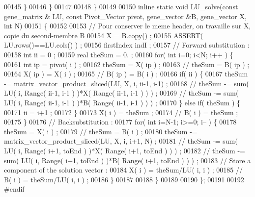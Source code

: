 \begin{DoxyCode}
00145       \}
00146     \}
00147 
00148   \}
00149 
00150   \textcolor{keyword}{inline} \textcolor{keyword}{static} \textcolor{keywordtype}{void} LU\_solve(\textcolor{keyword}{const} gene\_matrix & LU, \textcolor{keyword}{const} Pivot\_Vector pivot, gene\_vector &B, gene\_vector
       X, \textcolor{keywordtype}{int} N)
00151   \{
00152 
00153     \textcolor{comment}{// Pour conserver le meme header, on travaille sur X, copie du second-membre B}
00154     X = B.copy() ;
00155     ASSERT( LU.rows()==LU.cols() ) ;
00156     firstIndex indI ;
00157     \textcolor{comment}{// Forward substitution :}
00158     \textcolor{keywordtype}{int} ii = 0 ;
00159     real theSum = 0. ;
00160     \textcolor{keywordflow}{for}( \textcolor{keywordtype}{int} i=0; i<N; i++ ) \{
00161       \textcolor{keywordtype}{int} ip = pivot( i ) ;
00162       theSum = X( ip ) ;
00163       \textcolor{comment}{//      theSum = B( ip ) ;}
00164       X( ip ) = X( i ) ;
00165       \textcolor{comment}{//      B( ip ) = B( i ) ;}
00166       \textcolor{keywordflow}{if}( ii ) \{
00167     theSum -= matrix\_vector\_product\_sliced(LU, X, i, ii-1, i-1) ;
00168     \textcolor{comment}{//  theSum -= sum( LU( i, Range( ii-1, i-1 ) )*X( Range( ii-1, i-1 ) ) ) ;}
00169     \textcolor{comment}{//  theSum -= sum( LU( i, Range( ii-1, i-1 ) )*B( Range( ii-1, i-1 ) ) ) ;}
00170       \} \textcolor{keywordflow}{else} \textcolor{keywordflow}{if}( theSum ) \{
00171     ii = i+1 ;
00172       \}
00173       X( i ) = theSum ;
00174       \textcolor{comment}{//      B( i ) = theSum ;}
00175     \}
00176     \textcolor{comment}{// Backsubstitution :}
00177     \textcolor{keywordflow}{for}( \textcolor{keywordtype}{int} i=N-1; i>=0; i-- ) \{
00178       theSum = X( i ) ;
00179       \textcolor{comment}{//      theSum = B( i ) ;}
00180       theSum -= matrix\_vector\_product\_sliced(LU, X, i, i+1, N) ;
00181       \textcolor{comment}{//      theSum -= sum( LU( i, Range( i+1, toEnd ) )*X( Range( i+1, toEnd ) ) ) ;}
00182       \textcolor{comment}{//      theSum -= sum( LU( i, Range( i+1, toEnd ) )*B( Range( i+1, toEnd ) ) ) ;}
00183       \textcolor{comment}{// Store a component of the solution vector :}
00184       X( i ) = theSum/LU( i, i ) ;
00185       \textcolor{comment}{//      B( i ) = theSum/LU( i, i ) ;}
00186     \}
00187 
00188   \}
00189 
00190 \};
00191 
00192 \textcolor{preprocessor}{#endif}
\end{DoxyCode}
